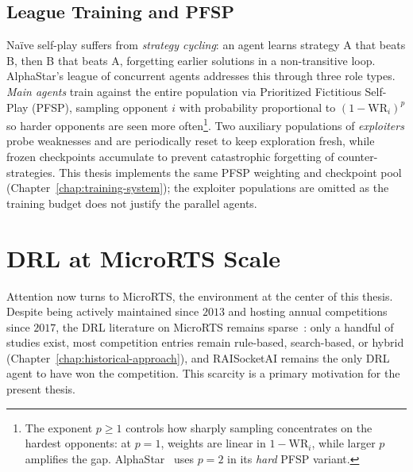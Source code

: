 \subsection{League Training and PFSP}

Na\"ive self-play suffers from \emph{strategy cycling}: an agent learns strategy A that beats B, then B that beats A, forgetting earlier solutions in a non-transitive loop. AlphaStar's league of concurrent agents addresses this through three role types. \emph{Main agents} train against the entire population via Prioritized Fictitious Self-Play (PFSP), sampling opponent $i$ with probability proportional to $(1 - \mathrm{WR}_i)^p$ so harder opponents are seen more often\footnote{The exponent $p \geq 1$ controls how sharply sampling concentrates on the hardest opponents: at $p = 1$, weights are linear in $1 - \mathrm{WR}_i$, while larger $p$ amplifies the gap. AlphaStar~\cite{vinyalsGrandmasterLevelStarCraft2019} uses $p = 2$ in its \emph{hard} PFSP variant.}. Two auxiliary populations of \emph{exploiters} probe weaknesses and are periodically reset to keep exploration fresh, while frozen checkpoints accumulate to prevent catastrophic forgetting of counter-strategies. This thesis implements the same PFSP weighting and checkpoint pool (Chapter~\ref{chap:training-system}); the exploiter populations are omitted as the training budget does not justify the parallel agents.

\section{DRL at MicroRTS Scale}
\label{sec:microRTS_sota}

Attention now turns to MicroRTS, the environment at the center of this thesis. Despite being actively maintained since $2013$ and hosting annual competitions since $2017$, the DRL literature on MicroRTS remains sparse~\cite{barrosesaDeepReinforcementLearning2025, endlaDeepReinforcementLearning2025}: only a handful of studies exist, most competition entries remain rule-based, search-based, or hybrid (Chapter~\ref{chap:historical-approach}), and RAISocketAI remains the only DRL agent to have won the competition. This scarcity is a primary motivation for the present thesis.

\vspace{-0.2em}

